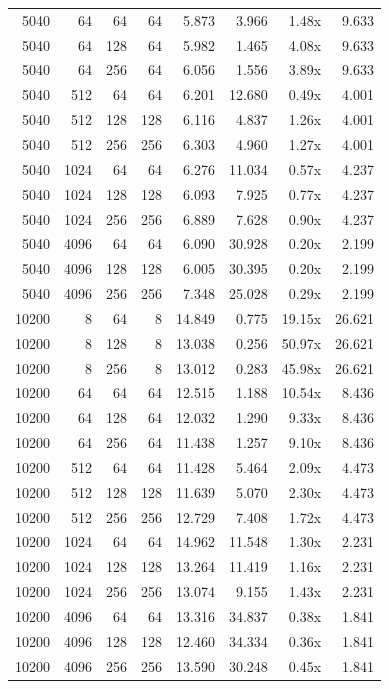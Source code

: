 {\begin{longtable}{rrrrrrrr}
5040 & 64 & 64 & 64 & 5.873 & 3.966 & 1.48x & 9.633\\
5040 & 64 & 128 & 64 & 5.982 & 1.465 & 4.08x & 9.633\\
5040 & 64 & 256 & 64 & 6.056 & 1.556 & 3.89x & 9.633\\
5040 & 512 & 64 & 64 & 6.201 & 12.680 & 0.49x & 4.001\\
5040 & 512 & 128 & 128 & 6.116 & 4.837 & 1.26x & 4.001\\
5040 & 512 & 256 & 256 & 6.303 & 4.960 & 1.27x & 4.001\\
5040 & 1024 & 64 & 64 & 6.276 & 11.034 & 0.57x & 4.237\\
5040 & 1024 & 128 & 128 & 6.093 & 7.925 & 0.77x & 4.237\\
5040 & 1024 & 256 & 256 & 6.889 & 7.628 & 0.90x & 4.237\\
5040 & 4096 & 64 & 64 & 6.090 & 30.928 & 0.20x & 2.199\\
5040 & 4096 & 128 & 128 & 6.005 & 30.395 & 0.20x & 2.199\\
5040 & 4096 & 256 & 256 & 7.348 & 25.028 & 0.29x & 2.199\\
10200 & 8 & 64 & 8 & 14.849 & 0.775 & 19.15x & 26.621\\
10200 & 8 & 128 & 8 & 13.038 & 0.256 & 50.97x & 26.621\\
10200 & 8 & 256 & 8 & 13.012 & 0.283 & 45.98x & 26.621\\
10200 & 64 & 64 & 64 & 12.515 & 1.188 & 10.54x & 8.436\\
10200 & 64 & 128 & 64 & 12.032 & 1.290 & 9.33x & 8.436\\
10200 & 64 & 256 & 64 & 11.438 & 1.257 & 9.10x & 8.436\\
10200 & 512 & 64 & 64 & 11.428 & 5.464 & 2.09x & 4.473\\
10200 & 512 & 128 & 128 & 11.639 & 5.070 & 2.30x & 4.473\\
10200 & 512 & 256 & 256 & 12.729 & 7.408 & 1.72x & 4.473\\
10200 & 1024 & 64 & 64 & 14.962 & 11.548 & 1.30x & 2.231\\
10200 & 1024 & 128 & 128 & 13.264 & 11.419 & 1.16x & 2.231\\
10200 & 1024 & 256 & 256 & 13.074 & 9.155 & 1.43x & 2.231\\
10200 & 4096 & 64 & 64 & 13.316 & 34.837 & 0.38x & 1.841\\
10200 & 4096 & 128 & 128 & 12.460 & 34.334 & 0.36x & 1.841\\
10200 & 4096 & 256 & 256 & 13.590 & 30.248 & 0.45x & 1.841\\

\end{longtable}}
